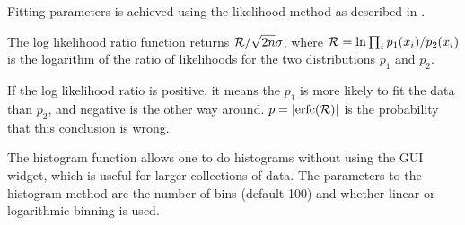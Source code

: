 Fitting parameters is achieved using the likelihood method as
described in \cite{Clauset-etal07}.

The log likelihood ratio function returns ${\cal R}/\sqrt{2n}\sigma$,
where ${\cal R}=\ln \prod_i p_1(x_i)/p_2(x_i)$ is the logarithm of the
ratio of likelihoods for the two distributions $p_1$ and $p_2$.

If the log likelihood ratio is positive, it means the $p_1$ is more
likely to fit the data than $p_2$, and negative is the other way
around. $p=|\mathrm{erfc}({\cal R})|$ is the probability that this conclusion
is wrong.\cite{Clauset-etal07}

The histogram function allows one to do histograms without using the
GUI widget, which is useful for larger collections of data. The
parameters to the histogram method are the number of bins (default
100) and whether linear or logarithmic binning is used.
